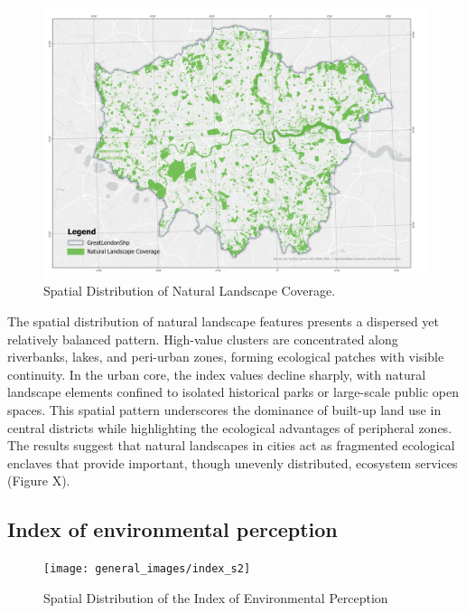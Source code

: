 \documentclass[
  12pt,
  oneside]{book}
\begin{document}
\begin{figure}

{\centering \includegraphics[width=0.95\linewidth]{general_images/nf} 

}

\caption{Spatial Distribution of Natural Landscape Coverage.}\label{fig:nf}
\end{figure}

The spatial distribution of natural landscape features presents a dispersed yet relatively balanced pattern. High-value clusters are concentrated along riverbanks, lakes, and peri-urban zones, forming ecological patches with visible continuity. In the urban core, the index values decline sharply, with natural landscape elements confined to isolated historical parks or large-scale public open spaces. This spatial pattern underscores the dominance of built-up land use in central districts while highlighting the ecological advantages of peripheral zones. The results suggest that natural landscapes in cities act as fragmented ecological enclaves that provide important, though unevenly distributed, ecosystem services (Figure X).

\subsection{Index of environmental perception}\label{index-of-environmental-perception}

\begin{figure}

{\centering \texttt{[image: general\_images/index\_s2]} 

}

\caption{Spatial Distribution of the Index of Environmental Perception}\label{fig:indexs2}
\end{figure}
\end{document}

